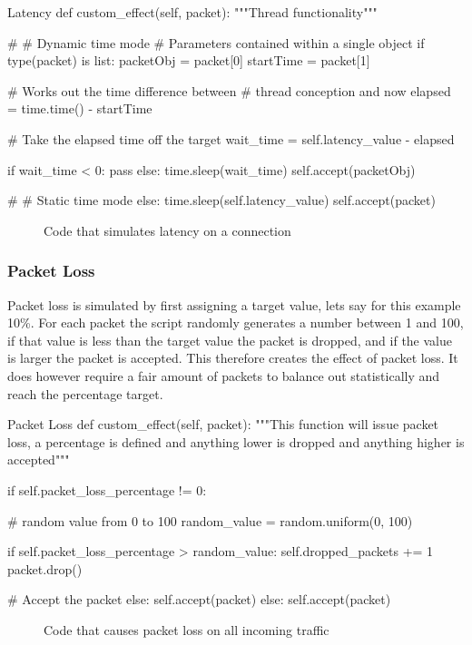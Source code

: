 \begin{Code}{Latency}
def custom_effect(self, packet):
	"""Thread functionality"""

	# # Dynamic time mode
	# Parameters contained within a single object
	if type(packet) is list:
		packetObj = packet[0]
		startTime = packet[1]

		# Works out the time difference between
		# thread conception and now
		elapsed = time.time() - startTime
            
		# Take the elapsed time off the target
		wait_time = self.latency_value - elapsed

		if wait_time < 0:
			pass
		else:
			time.sleep(wait_time)
			self.accept(packetObj)
			
	# # Static time mode
	else:
		time.sleep(self.latency_value)
		self.accept(packet)

\end{Code}
\begin{figure}[h]
	\caption{Code that simulates latency on a connection}
\end{figure}

\subsubsection{Packet Loss}
Packet loss is simulated by first assigning a target value, lets say for this example 10\%. For each packet the script randomly generates a number between 1 and 100, if that value is less than the target value the packet is dropped, and if the value is larger the packet is accepted. This therefore creates the effect of packet loss. It does however require a fair amount of packets to balance out statistically and reach the percentage target.

\begin{Code}{Packet Loss}
def custom_effect(self, packet):
        """This function will issue packet loss,
           a percentage is defined and anything
           lower is dropped and anything higher is accepted"""

        if self.packet_loss_percentage != 0:

            # random value from 0 to 100
            random_value = random.uniform(0, 100)

            if self.packet_loss_percentage > random_value:
                self.dropped_packets += 1
                packet.drop()

            # Accept the packet
            else:
                self.accept(packet)
        else:
            self.accept(packet)
\end{Code}
\begin{figure}[h]
	\caption{Code that causes packet loss on all incoming traffic}
\end{figure}


